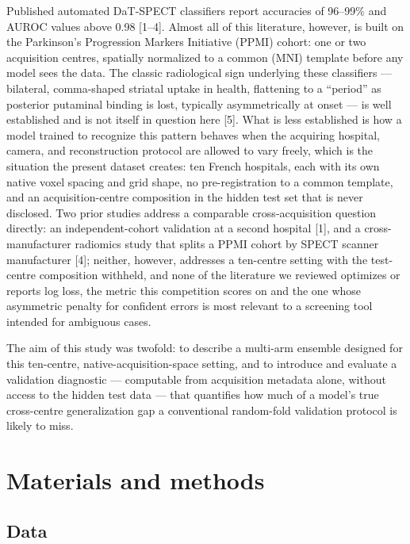 \documentclass[11pt]{article}
\begin{document}
Published automated DaT-SPECT classifiers report accuracies of 96--99\% and AUROC values above 0.98 [1--4]. Almost all of this literature, however, is built on the Parkinson's Progression Markers Initiative (PPMI) cohort: one or two acquisition centres, spatially normalized to a common (MNI) template before any model sees the data. The classic radiological sign underlying these classifiers --- bilateral, comma-shaped striatal uptake in health, flattening to a ``period'' as posterior putaminal binding is lost, typically asymmetrically at onset --- is well established and is not itself in question here [5]. What is less established is how a model trained to recognize this pattern behaves when the acquiring hospital, camera, and reconstruction protocol are allowed to vary freely, which is the situation the present dataset creates: ten French hospitals, each with its own native voxel spacing and grid shape, no pre-registration to a common template, and an acquisition-centre composition in the hidden test set that is never disclosed. Two prior studies address a comparable cross-acquisition question directly: an independent-cohort validation at a second hospital [1], and a cross-manufacturer radiomics study that splits a PPMI cohort by SPECT scanner manufacturer [4]; neither, however, addresses a ten-centre setting with the test-centre composition withheld, and none of the literature we reviewed optimizes or reports log loss, the metric this competition scores on and the one whose asymmetric penalty for confident errors is most relevant to a screening tool intended for ambiguous cases.

The aim of this study was twofold: to describe a multi-arm ensemble designed for this ten-centre, native-acquisition-space setting, and to introduce and evaluate a validation diagnostic --- computable from acquisition metadata alone, without access to the hidden test data --- that quantifies how much of a model's true cross-centre generalization gap a conventional random-fold validation protocol is likely to miss.

\section*{Materials and methods}

\subsection*{Data}
\end{document}
